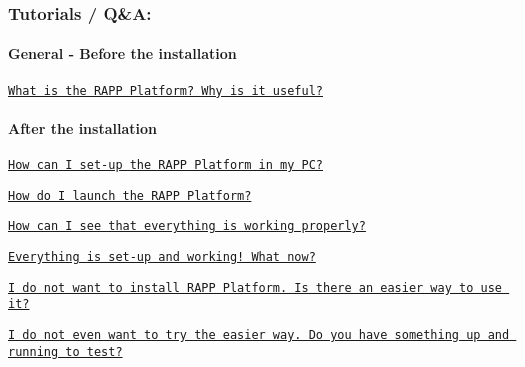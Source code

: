 \subsubsection*{Tutorials / Q\&A\-:}

\paragraph*{General -\/ Before the installation}


\begin{DoxyItemize}
\item \href{https://github.com/rapp-project/rapp-platform/wiki/What-is-the-RAPP-Platform%3F-Why-is-it-useful%3F}{\tt What is the R\-A\-P\-P Platform? Why is it useful?}
\end{DoxyItemize}

\paragraph*{After the installation}


\begin{DoxyItemize}
\item \href{https://github.com/rapp-project/rapp-platform/wiki/How-can-I-set-up-the-RAPP-Platform-in-my-PC%3F}{\tt How can I set-\/up the R\-A\-P\-P Platform in my P\-C?}
\item \href{https://github.com/rapp-project/rapp-platform/wiki/How-do-I-launch-the-RAPP-Platform%3F}{\tt How do I launch the R\-A\-P\-P Platform?}
\item \href{https://github.com/rapp-project/rapp-platform/wiki/How-can-I-see-that-everything-is-working-properly%3F}{\tt How can I see that everything is working properly?}
\item \href{https://github.com/rapp-project/rapp-platform/wiki/Everything-is-set-up-and-working!-What-now%3F}{\tt Everything is set-\/up and working! What now?}
\item \href{https://github.com/rapp-project/rapp-platform/wiki/I-do-not-want-to-install-RAPP-Platform.-Is-there-an-easier-way-to-use-it%3F}{\tt I do not want to install R\-A\-P\-P Platform. Is there an easier way to use it?}
\item \href{https://github.com/rapp-project/rapp-platform/wiki/I-do-not-even-want-to-try-the-easier-way.-Do-you-have-something-up-and-running-to-test%3F}{\tt I do not even want to try the easier way. Do you have something up and running to test?}
\end{DoxyItemize}

